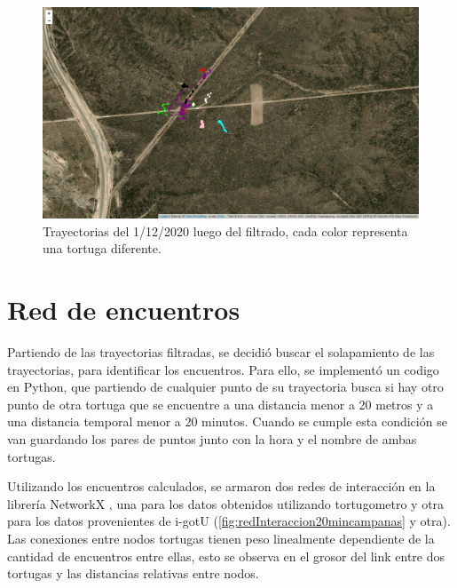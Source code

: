 \begin{figure}[h]
    \begin{center}
       
   
    \includegraphics[width=\imsize]{Chap2/Traye1_12_conF.png}
\end{center}
    \caption[Trayectorias un dia de medición, despues del filtrado.]{Trayectorias del 1/12/2020 luego del filtrado, cada color representa una tortuga diferente.}
    \label{fig:trayeConFiltr}
\end{figure}

\section{Red de encuentros}
Partiendo de las trayectorias filtradas, se decidió buscar el solapamiento de las trayectorias, para identificar los encuentros. Para ello, se implementó un codigo en Python, que partiendo de cualquier punto de su trayectoria busca si hay otro punto de otra tortuga que se encuentre a una distancia menor a 20 metros y a una distancia temporal menor a 20 minutos. Cuando se cumple esta condición se van guardando los pares de puntos junto con la hora y el nombre de ambas tortugas. 

Utilizando los encuentros calculados, se armaron dos redes de interacción  en la librería NetworkX \cite{networkx}, una para los datos obtenidos utilizando  tortugometro y otra para los datos provenientes de i-gotU (\ref{fig:redInteraccion20mincampanas} y otra). Las conexiones entre nodos tortugas tienen peso linealmente dependiente de la cantidad de encuentros entre ellas, esto se observa en el grosor del link entre dos tortugas y las distancias relativas entre nodos.


